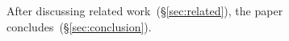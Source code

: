 After discussing related work~(\S\ref{sec:related}),
the paper concludes~(\S\ref{sec:conclusion}).



%
%
%
%
%
